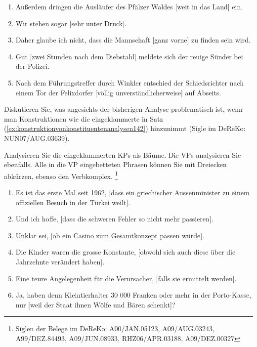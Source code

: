 \begin{sloppypar}
\begin{enumerate}
  \item Außerdem dringen die Ausläufer des Pfälzer Waldes [weit in das Land] ein.
  \item Wir stehen sogar [sehr unter Druck].
  \item Daher glaube ich nicht, dass die Mannschaft [ganz vorne] zu finden sein wird.
  \item Gut [zwei Stunden nach dem Diebstahl] meldete sich der reuige Sünder bei der Polizei.
  \item Nach dem Führungstreffer durch Winkler entschied der Schiedsrichter nach einem Tor der Felixdorfer [völlig unverständlicherweise] auf Abseits.
\end{enumerate}

 \label{exc:phrasen03} Diskutieren Sie, was angesichts der bisherigen Analyse problematisch ist, wenn man Konstruktionen wie die eingeklammerte in Satz (\ref{ex:konstruktionvonkonstituentenanalysen142}) hinzunimmt (Sigle im DeReKo: NUN07\slash AUG.03639).

\begin{exe}
\end{exe}

 \label{exc:phrasen04} Analysieren Sie die eingeklammerten KPs als Bäume.
Die VPs analysieren Sie ebenfalls.
Alle in die VP eingebetteten Phrasen können Sie mit Dreiecken abkürzen, ebenso den Verbkomplex.%
\footnote{Siglen der Belege im DeReKo: A00\slash JAN.05123, A09\slash AUG.03243, A99\slash DEZ.84493, A09\slash JUN.08933, RHZ06\slash APR.03188, A09\slash DEZ.00327}

\begin{enumerate}
  \item Es ist das erste Mal seit 1962, [dass ein griechischer Aussenminister zu einem offiziellen Besuch in der Türkei weilt].
  \item Und ich hoffe, [dass die schweren Fehler so nicht mehr passieren].
  \item Unklar sei, [ob ein Casino zum Gesamtkonzept passen würde].
  \item Die Kinder waren die grosse Konstante, [obwohl sich auch diese über die Jahrzehnte verändert haben].
  \item Eine teure Angelegenheit für die Verursacher, [falls sie ermittelt werden].
  \item Ja, haben denn Kleintierhalter 30 000 Franken oder mehr in der Porto-Kasse, nur [weil der Staat ihnen Wölfe und Bären schenkt]?
\end{enumerate}


\end{sloppypar}
